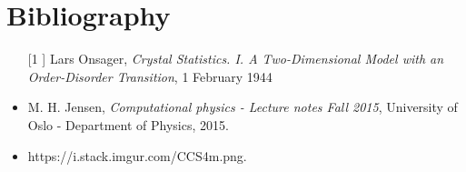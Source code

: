 \documentclass[%
preprint,
 amsmath,amssymb,
 aps,
]{revtex4-1}
\theoremstyle{plain}
\theoremstyle{definition}
\theoremstyle{plain}
\begin{document}



\section{Bibliography}
\begin{itemize}
\item[[1]] Lars Onsager, \textit{Crystal Statistics. I. A Two-Dimensional Model with an Order-Disorder Transition}, 1 February 1944
\item M. H. Jensen, \textit{Computational physics - Lecture notes Fall 2015}, University of Oslo - Department of Physics, 2015. 
\item https://i.stack.imgur.com/CCS4m.png.

\end{itemize}
\end{document}
